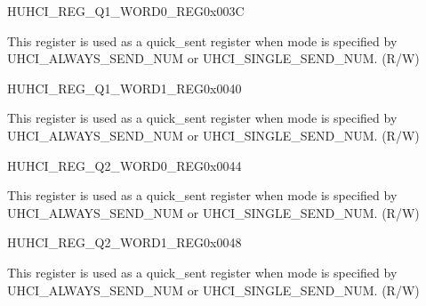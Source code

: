 \begin{register}{H}{UHCI\_REG\_Q1\_WORD0\_REG}{0x003C}\label{regdesc:UHCIREGQ1WORD0REG}
%
\regnewline%
\begin{regdesc}\begin{reglist}
\label{fielddesc:UHCISENDQ1WORD0}\item [UHCI\_SEND\_Q1\_WORD0] This register is used as a quick\_sent register when mode is specified by UHCI\_ALWAYS\_SEND\_NUM or UHCI\_SINGLE\_SEND\_NUM. (R/W)
\end{reglist}\end{regdesc}
\end{register}


\begin{register}{H}{UHCI\_REG\_Q1\_WORD1\_REG}{0x0040}\label{regdesc:UHCIREGQ1WORD1REG}
%
\regnewline%
\begin{regdesc}\begin{reglist}
\label{fielddesc:UHCISENDQ1WORD1}\item [UHCI\_SEND\_Q1\_WORD1] This register is used as a quick\_sent register when mode is specified by UHCI\_ALWAYS\_SEND\_NUM or UHCI\_SINGLE\_SEND\_NUM. (R/W)
\end{reglist}\end{regdesc}
\end{register}


\begin{register}{H}{UHCI\_REG\_Q2\_WORD0\_REG}{0x0044}\label{regdesc:UHCIREGQ2WORD0REG}
%
\regnewline%
\begin{regdesc}\begin{reglist}
\label{fielddesc:UHCISENDQ2WORD0}\item [UHCI\_SEND\_Q2\_WORD0] This register is used as a quick\_sent register when mode is specified by UHCI\_ALWAYS\_SEND\_NUM or UHCI\_SINGLE\_SEND\_NUM. (R/W)
\end{reglist}\end{regdesc}
\end{register}


\begin{register}{H}{UHCI\_REG\_Q2\_WORD1\_REG}{0x0048}\label{regdesc:UHCIREGQ2WORD1REG}
%
\regnewline%
\begin{regdesc}\begin{reglist}
\label{fielddesc:UHCISENDQ2WORD1}\item [UHCI\_SEND\_Q2\_WORD1] This register is used as a quick\_sent register when mode is specified by UHCI\_ALWAYS\_SEND\_NUM or UHCI\_SINGLE\_SEND\_NUM. (R/W)
\end{reglist}\end{regdesc}
\end{register}


